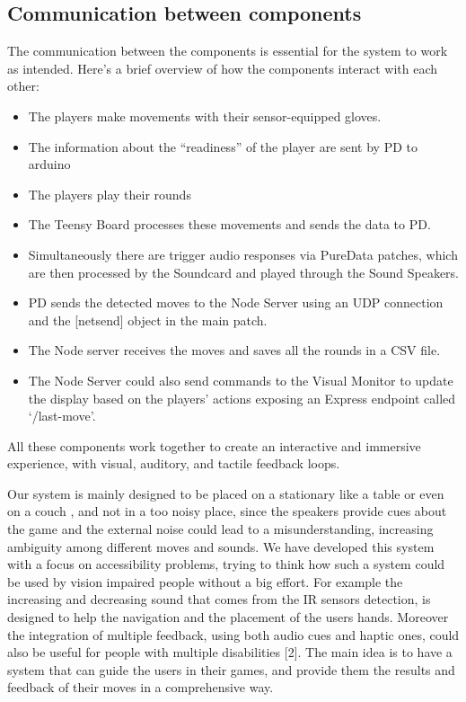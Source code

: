 \documentclass[11pt]{report}
\begin{document}
\subsection*{Communication between components}
The communication between the components is essential for the system to work as intended. Here's a brief overview of how the components interact with each other:
\begin{itemize}
  \item The players make movements with their sensor-equipped gloves.
  \item The information about the “readiness” of the player are sent by PD to arduino
  \item The players play their rounds
  \item The Teensy Board processes these movements and sends the data to PD.
  \item Simultaneously there are trigger audio responses via PureData patches, which are then processed by the Soundcard and played through the Sound Speakers.
  \item PD sends the detected moves to the Node Server using an UDP connection and the [netsend] object in the main patch.
  \item The Node server receives the moves and saves all the rounds in a CSV file.
  \item The Node Server could also send commands to the Visual Monitor to update the display based on the players' actions exposing an Express endpoint called ‘/last-move’.
\end{itemize}
All these components work together to create an interactive and immersive experience, with visual, auditory, and tactile feedback loops. 

Our system is mainly designed to be placed on a stationary like a table or even on a couch , and not in a too noisy place, since the speakers provide cues about the game and the external noise could lead to a misunderstanding, increasing ambiguity among different moves and sounds.
We have developed this system with a focus on accessibility problems, trying to think how such a system could be used by vision impaired people without a big effort.
For example the increasing and decreasing sound that comes from the IR sensors detection, is designed to help the navigation and the placement of the users hands.
Moreover the integration of multiple feedback, using both audio cues and haptic ones, could also be useful for people with multiple disabilities [2].
The main idea is to have a system that can guide the users in their games, and provide them the results and feedback of their moves in a comprehensive way.
\end{document}
